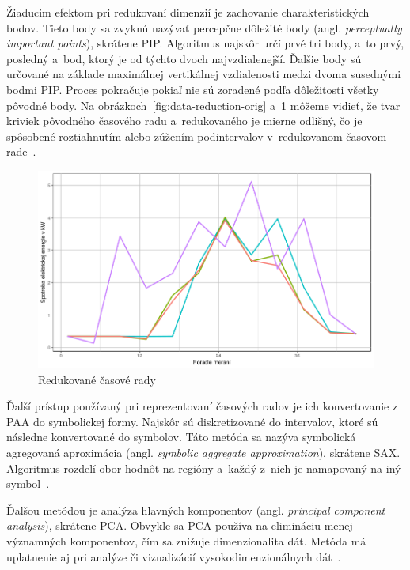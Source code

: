 \documentclass[a4paper,twoside,slovak,12pt,appendix]{article}
\begin{document}
Žiaducim efektom pri redukovaní dimenzií je zachovanie charakteristických bodov.
Tieto body sa zvyknú nazývať percepčne dôležité body (angl. \textit{perceptually
important points}), skrátene PIP. Algoritmus najskôr určí prvé tri body, a~to
prvý, posledný a~bod, ktorý je od týchto dvoch najvzdialenejší. Ďalšie body sú
určované na základe maximálnej vertikálnej vzdialenosti medzi dvoma susednými
bodmi PIP. Proces pokračuje pokiaľ nie sú zoradené podľa dôležitosti všetky
pôvodné body. Na obrázkoch~\ref{fig:data-reduction-orig}
a~\ref{fig:data-reduction-agg} môžeme vidieť, že tvar kriviek pôvodného časového
radu a~redukovaného je mierne odlišný, čo je spôsobené roztiahnutím alebo
zúžením podintervalov v~redukovanom časovom rade~\cite{Fu2011}.

\begin{figure}[htbp]
  \centering
  \includegraphics[width=\textwidth]{data_reduction_agg.png}
  \caption{Redukované časové rady}
  \label{fig:data-reduction-agg}
\end{figure}

Ďalší prístup používaný pri reprezentovaní časových radov je ich konvertovanie
z PAA do symbolickej formy. Najskôr sú diskretizované do intervalov, ktoré sú
následne konvertované do symbolov. Táto metóda sa nazýva symbolická agregovaná
aproximácia (angl. \textit{symbolic aggregate approximation}), skrátene SAX.
Algoritmus rozdelí obor hodnôt na regióny a~každý z~nich je namapovaný na iný
symbol~\cite{Fu2011}.

Ďalšou metódou je analýza hlavných komponentov (angl. \textit{principal
component analysis}), skrátene PCA. Obvykle sa PCA používa na elimináciu menej
významných komponentov, čím sa znižuje dimenzionalita dát. Metóda má uplatnenie
aj pri analýze či vizualizácií vysokodimenzionálnych dát~\cite{Fu2011}.
\end{document}
